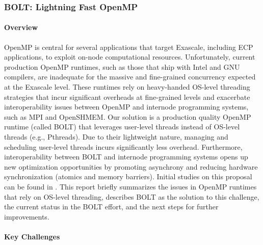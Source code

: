 \subsubsection{ BOLT: Lightning Fast OpenMP}\label{subsubsect:bolt}

\paragraph{Overview}

OpenMP is central for several applications that target Exascale,
including ECP applications, to exploit on-node computational
resources.  Unfortunately, current production OpenMP runtimes, such as
those that ship with Intel and GNU compilers, are inadequate for the
massive and fine-grained concurrency expected at the Exascale level.
These runtimes rely on heavy-handed OS-level threading strategies that
incur significant overheads at fine-grained levels and exacerbate
interoperability issues between OpenMP and internode programming
systems, such as MPI and OpenSHMEM.  Our solution is a production
quality OpenMP runtime (called BOLT) that leverages user-level threads
instead of OS-level threads (e.g., Pthreads).  Due to their
lightweight nature, managing and scheduling user-level threads incurs
significantly less overhead.  Furthermore, interoperability between
BOLT and internode programming systems opens up new optimization
opportunities by promoting asynchrony and reducing hardware
synchronization (atomics and memory barriers).  Initial studies on
this proposal can be found in \cite{amer2018, ccgrid, ppopp}. This report
briefly summarizes the issues in OpenMP runtimes that rely on OS-level
threading, describes BOLT as the solution to this challenge, the
current status in the BOLT effort, and the next steps for further
improvements.

\paragraph{Key Challenges}

